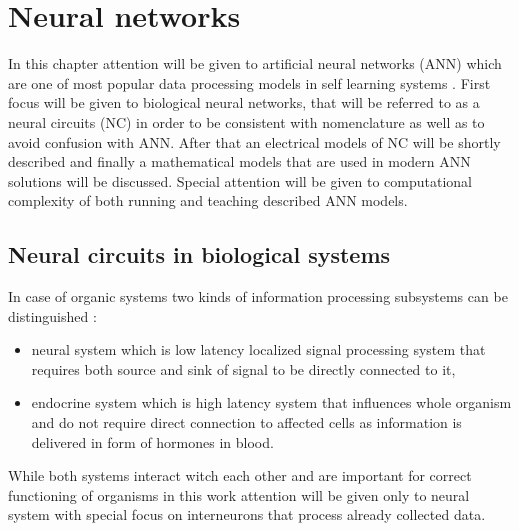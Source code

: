 \FloatBarrier
\chapter{Neural networks}

In this chapter attention will be given to artificial neural networks (ANN) which are one of most 
popular data processing models in self learning systems \cite{Abiodun2019} \cite{Tran2021}
\cite{Syed2021}. First focus will be given to biological neural networks, that will be referred 
to as a neural circuits (NC) in order to be consistent with nomenclature \cite{Purves2001} as 
well as to avoid confusion with ANN.  
After that an electrical models of NC will be shortly described and finally a mathematical models
that are used in modern ANN solutions will be discussed. Special attention will be given to 
computational complexity of both running and teaching described ANN models. 



\FloatBarrier
\section{Neural circuits in biological systems}
In case of organic systems two kinds of information processing subsystems can be distinguished
\cite{Johnson2016}:
\begin{itemize}
	\item neural system which is low latency localized signal processing system that requires
	both source and sink of signal to be directly connected to it, 
	\item endocrine system which is high latency system that influences whole organism and do 
	not require direct connection to affected cells as information is delivered in form of 
	hormones in blood.
\end{itemize}
While both systems interact witch each other and are important for correct functioning of 
organisms \cite{Schwarz2019} in this work attention will be given only to neural system with
special focus on interneurons that process already collected data.


\FloatBarrier
